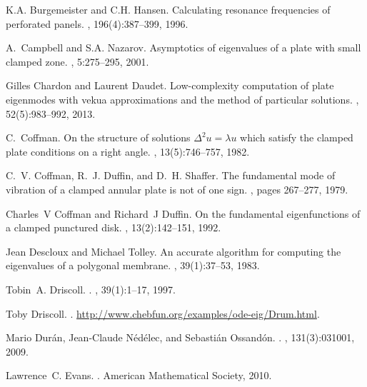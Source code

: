 \documentclass[times]{article}
\begin{document}
\begin{thebibliography}{10}
K.A. Burgemeister and C.H. Hansen.
\newblock Calculating resonance frequencies of perforated panels.
, 196(4):387--399, 1996.

A.~Campbell and S.A. Nazarov.
\newblock Asymptotics of eigenvalues of a plate with small clamped zone.
, 5:275--295, 2001.

Gilles Chardon and Laurent Daudet.
\newblock Low-complexity computation of plate eigenmodes with vekua
  approximations and the method of particular solutions.
, 52(5):983--992, 2013.

C.~Coffman.
\newblock On the structure of solutions ${\Delta ^2} u = \lambda u$ which
  satisfy the clamped plate conditions on a right angle.
, 13(5):746--757, 1982.

C.~V. Coffman, R.~J. Duffin, and D.~H. Shaffer.
\newblock The fundamental mode of vibration of a clamped annular plate is not
  of one sign.
, pages 267--277, 1979.

Charles~V Coffman and Richard~J Duffin.
\newblock On the fundamental eigenfunctions of a clamped punctured disk.
, 13(2):142--151, 1992.

Jean Descloux and Michael Tolley.
\newblock An accurate algorithm for computing the eigenvalues of a polygonal
  membrane.
,
  39(1):37--53, 1983.

Tobin~A. Driscoll.
.
, 39(1):1--17, 1997.

Toby Driscoll.
.
\newblock \url{http://www.chebfun.org/examples/ode-eig/Drum.html}.

Mario Dur{\'a}n, Jean-Claude N{\'e}d{\'e}lec, and Sebasti{\'a}n Ossand{\'o}n.
.
, 131(3):031001, 2009.

Lawrence~C. Evans.
.
\newblock American Mathematical Society, 2010.


\end{thebibliography}
\end{document}
